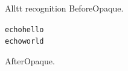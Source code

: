 \documentclass[aspectratio=169]{beamer}
\author{}
\date{}
\begin{document}
\begin{frame}[fragile]{Alltt recognition}
BeforeOpaque.
\begin{alltt}
  echo hello
  echo world
\end{alltt}
AfterOpaque.
\end{frame}
\end{document}
